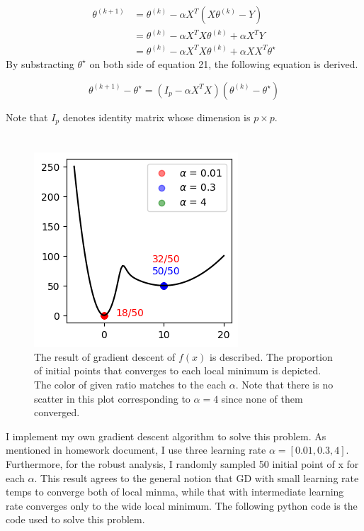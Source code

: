 \documentclass[10pt]{article}
\begin{document}
\begin{align}
    \theta^{(k+1)} &= \theta^{(k)}  - \alpha X^T(X\theta^{(k)}- Y) \\
    &= \theta^{(k)} - \alpha X^TX\theta^{(k)} + \alpha X^TY \\
    &= \theta^{(k)} - \alpha X^TX\theta^{(k)} + \alpha XX^T \theta^\star
\end{align}
By substracting $\theta^\star$ on both side of equation 21, the following equation is derived.

\begin{equation}
    \theta^{(k+1)} - \theta^\star = (I_p - \alpha X^TX)(\theta^{(k)} - \theta^\star)
\end{equation}

Note that $I_p$ denotes identity matrix whose dimension is $p \times p$.

\section{}
\begin{figure}[!h]
    \begin{center}
        \includegraphics{Fig1.png}
        \caption{The result of gradient descent of $f(x)$ is described. The proportion of initial points that converges to each local minimum is depicted. The color of given ratio matches to the each $\alpha$. Note that there is no scatter in this plot corresponding to $\alpha = 4$ since none of them converged. }
    \end{center}
\end{figure}

I implement my own gradient descent algorithm to solve this problem. As mentioned in homework document, I use three learning rate $\alpha = [0.01,0.3,4]$. Furthermore,
for the robust analysis, I randomly sampled 50 initial point of x for each $\alpha$. This result agrees to the general notion that GD with small learning rate temps to converge both of local minma, while that with intermediate learning rate converges only to the wide local minimum. 
The following python code is the code used to solve this problem.
\end{document}
